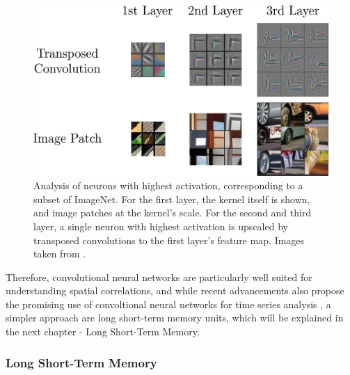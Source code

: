 \begin{figure}[h]
	\centering
	\includegraphics[scale=.28]{chapters/03_background/img/transposed_conv.png}
	\caption{Analysis of neurons with highest activation, corresponding to a subset of ImageNet. For the first layer, the kernel itself is shown, and image patches at the kernel's scale. For the second and third layer, a single neuron with highest activation is upscaled by transposed convolutions to the first layer's feature map. Images taken from \cite{zeiler2014visualizing}.}
	\label{fig::321_transposed_conv}
\end{figure}
Therefore, convolutional neural networks are particularly well suited for understanding spatial correlations, and while recent advancements also propose the promising use of convoltional neural networks for time series analysis \cite{vaswani2017attention}, a simpler approach are long short-term memory units, which will be explained in the next chapter - Long Short-Term Memory. 
\subsubsection{Long Short-Term Memory}

